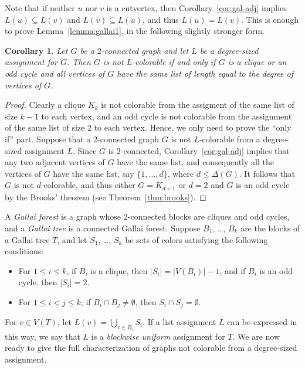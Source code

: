 \documentclass[12pt,twoside,openright,a4paper]{book}
\newtheorem{corollary}[theorem]{Corollary}
\begin{document}
Note that if neither $u$ nor $v$ is a cutvertex, then Corollary~\ref{cor:gal-adj} implies $L(u)\subseteq L(v)$ and $L(v)\subseteq L(u)$,
and thus $L(u)=L(v)$.  This is enough to prove Lemma~\ref{lemma:gallai1}, in the following slightly stronger form.

\begin{corollary}\label{cor:gal-2con}
Let $G$ be a $2$-connected graph and let $L$ be a degree-sized assignment for $G$.  Then $G$ is not $L$-colorable if and only if
$G$ is a clique or an odd cycle and all vertices of $G$ have the same list of length equal to the degree of vertices of $G$.
\end{corollary}
\begin{proof}
Clearly a clique $K_k$ is not colorable from the assigment of the same list of size $k-1$ to each vertex,
and an odd cycle is not colorable from the assignment of the same list of size $2$ to each vertex.
Hence, we only need to prove the ``only if'' part.  Suppose that a $2$-connected graph $G$ is not $L$-colorable
from a degree-sized assignment $L$.  Since $G$ is $2$-connected, Corollary~\ref{cor:gal-adj} implies that any two adjacent
vertices of $G$ have the same list, and consequently all the vertices of $G$ have the same list, say $\{1,\ldots,d\}$,
where $d\le \Delta(G)$.  It follows that $G$ is not $d$-colorable, and thus either $G=K_{d+1}$ or $d=2$ and $G$ is
an odd cycle by the Brooks' theorem (see Theorem~\ref{thm:brooks}).
\end{proof}

A \emph{Gallai forest} is a graph whose $2$-connected blocks are cliques and odd cycles,
and a \emph{Gallai tree} is a connected Gallai forest.
Suppose $B_1$, \ldots, $B_k$ are the blocks of a Gallai tree $T$, and let $S_1$, \ldots, $S_k$ be sets of colors
satisfying the following conditions:
\begin{itemize}
\item For $1\le i\le k$, if $B_i$ is a clique, then $|S_i|=|V(B_i)|-1$, and if $B_i$ is an odd cycle, then $|S_i|=2$.
\item For $1\le i<j\le k$, if $B_i\cap B_j\neq\emptyset$, then $S_i\cap S_j=\emptyset$.
\end{itemize}
For $v\in V(T)$, let $L(v)=\bigcup_{v\in B_i} S_i$.  If a list assignment $L$ can be expressed in this way, we say
that $L$ is a \emph{blockwise uniform} assignment for $T$.  We are now ready to give the full characterization of
graphs not colorable from a degree-sized assignment.
\end{document}
